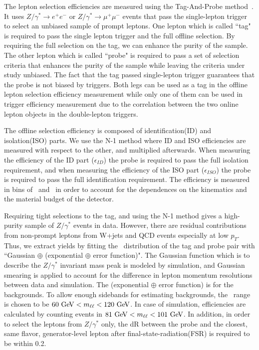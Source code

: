 The lepton selection efficiencies are measured using the Tag-And-Probe 
method~\cite{Abulencia:2005ix}. It uses 
$Z/\gamma^* \rightarrow e^+e^-$ or $Z/\gamma^* \rightarrow \mu^+\mu^-$ events 
that pass the single-lepton trigger to select an unbiased sample of prompt leptons.  
One lepton which is called ``tag" is required to pass the single lepton trigger 
and the full offline selection. By requiring the full selection on the tag, 
we can enhance the purity of the sample. The other lepton which is called 
``probe" is required to pass a set of selection criteria that enhances the purity 
of the sample while leaving the criteria under study unbiased. The fact that the tag 
passed single-lepton trigger guarantees that the probe is not biased by triggers. 
Both legs can be used as a tag in the offline lepton selection efficiency measurement 
while only one of them can be used in trigger efficiency measurement due to the correlation 
between the two online lepton objects in the double-lepton triggers. 

The offline selection efficiency is composed of identification(ID) and isolation(ISO) parts. 
We use the N-1 method where ID and ISO efficiencies are measured with respect to the other, 
and multiplied afterwards. When measuring the efficiency of the ID part ($\epsilon_{ID}$) 
the probe is required to pass the full isolation requirement, and when measuring 
the efficiency of the ISO part ($\epsilon_{ISO}$) the probe is required to pass 
the full identification requirement. The efficiency is measured in bins of 
\pt\ and \Eta\ in order to account for the dependences on the kinematics and 
the material budget of the detector. 

Requiring tight selections to the tag, and using the N-1 method gives a high-purity sample 
of $Z/\gamma^*$ events in data. However, there are residual contributions from 
non-prompt leptons from W+jets and QCD events especially at low $p_T$. 
Thus, we extract yields by fitting the \mll~distribution of the tag and probe pair
with ``Gaussian $\oplus$ (exponential $\oplus$ error function)". 
The Gaussian function which is to describe the 
$Z/\gamma^*$ invariant mass peak is modeled by simulation, and 
Gaussian smearing is applied to account for the difference in lepton momentum resolutions
between data and simulation. 
The (exponential $\oplus$ error function) is for the backgrounds.
To allow enough sidebands for estimating backgrounds, the \mll~range is chosen to be 
$60~\mathrm{Ge\kern -0.1em V} < m_{\ell\ell} < 120~\mathrm{Ge\kern -0.1em V}$. In case of simulation, efficiencies are calculated by 
counting events in $81~\mathrm{Ge\kern -0.1em V} < m_{\ell\ell} < 101~\mathrm{Ge\kern -0.1em V}$. In addition, in order to select  
the leptons from $Z/\gamma^*$ only, the dR between 
the probe and the closest, same flavor, generator-level lepton after final-state-radiation(FSR)
is required to be within 0.2.

